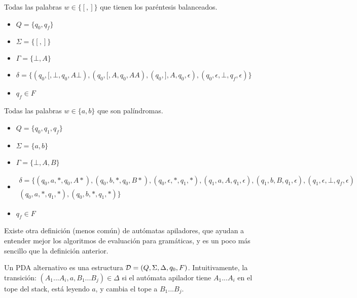 \documentclass[a4paper,twoside,master.tex]{article}
\begin{document}
\begin{ej}
    Todas las palabras $w \in \{ [,] \}$ que tienen los paréntesis balanceados.
    \begin{itemize}
        \item $Q = \{ q_0, q_f \}$
        \item $\Sigma = \{ [,] \}$
        \item $\Gamma = \{ \bot, A \}$
        \item $\delta = \{ (q_0, [, \bot, q_0, A\bot ), (q_0, [, A, q_0, AA ), (q_0, ], A, q_0, \epsilon ), (q_0, \epsilon, \bot, q_f, \epsilon ) \}$
        \item $q_f \in F$
    \end{itemize}
\end{ej}

\begin{ej}
    Todas las palabras $w \in \{ a, b \}$ que son palíndromas.
    \begin{itemize}
        \item $Q = \{ q_0, q_1, q_f \}$
        \item $\Sigma = \{ a, b \}$
        \item $\Gamma = \{ \bot, A, B \}$
        \item $\begin{aligned}
                      \delta = \{
                      (q_0, a, *, q_0, A*), (q_0, b, *, q_0, B*), (q_0, \epsilon, *, q_1, *), (q_1, a, A, q_1, \epsilon), (q_1, b, B, q_1, \epsilon), (q_1, \epsilon, \bot, q_f, \epsilon) \\
                      (q_0, a, *, q_1, *), (q_0, b, *, q_1, *)
                      \}
                  \end{aligned}$
        \item $q_f \in F$
    \end{itemize}
\end{ej}

\hr

Existe otra definición (menos común) de autómatas apiladores, que ayudan a entender mejor los algoritmos de evaluación para gramáticas, y es un poco más sencillo que la definición anterior.

\begin{definicion}
    Un PDA alternativo es una estructura $\mathcal{D} = (Q, \Sigma, \Delta, q_0, F)$. Intuitivamente, la transición: $(A_1...A_i, a, B_1...B_j) \in \Delta$ si el autómata apilador tiene $A_1...A_i$ en el tope del stack, está leyendo $a$, y cambia el tope a $B_1...B_j$.
\end{definicion}
\end{document}
